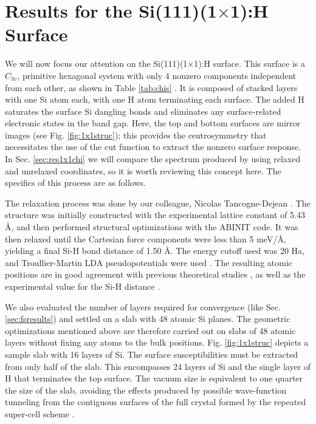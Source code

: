 
\section{Results for the \texorpdfstring{Si(111)(1$\times$1):H}{Si(111)(1x1):H}
Surface}\label{sec:Si1x1results}

We will now focus our attention on the Si(111)(1$\times$1):H surface. This
surface is a $C_{3v}$, primitive hexagonal system with only 4 nonzero components
independent from each other, as shown in Table \ref{tab:chis} \cite{popovbook,
sipePRB87, mizrahiJOSA88}. It is composed of stacked layers with one Si atom
each, with one H atom terminating each surface. The added H saturates the
surface Si dangling bonds and eliminates any surface-related electronic states
in the band gap. Here, the top and bottom surfaces are mirror images (see Fig.
\ref{fig:1x1struc}); this provides the centrosymmetry that necessitates the use
of the cut function to extract the nonzero surface response. In Sec.
\ref{sec:res1x1chi} we will compare the spectrum produced by using relaxed and
unrelaxed coordinates, so it is worth reviewing this concept here. The specifics
of this process are as follows.

The relaxation process was done by our colleague, Nicolas Tancogne-Dejean
\cite{tancognedejean:tel-01235611}. The structure was initially constructed with
the experimental lattice constant of 5.43 \AA, and then performed structural
optimizations with the ABINIT \cite{gonzeCPS09, abinit} code. It was then
relaxed until the Cartesian force components were less than 5 meV/\AA, yielding
a final Si-H bond distance of 1.50 \AA. The energy cutoff used was 20 Ha, and
Troullier-Martin LDA pseudopotentials were used \cite{troullierPRB91}. The
resulting atomic positions are in good agreement with previous theoretical
studies \cite{kaxirasPRB88, jonaPRB95, alfonsoPRB96, cargnoniJOCP00,
mejiaPRB02}, as well as the experimental value for the Si-H distance
\cite{weastCRC88}.

We also evaluated the number of layers required for convergence (like Sec.
\ref{sec:fsresults}) and settled on a slab with 48 atomic Si planes. The
geometric optimizations mentioned above are therefore carried out on slabs of 48
atomic layers without fixing any atoms to the bulk positions. Fig.
\ref{fig:1x1struc} depicts a sample slab with 16 layers of Si. The surface
susceptibilities must be extracted from only half of the slab. This encompasses
24 layers of Si and the single layer of H that terminates the top surface. The
vacuum size is equivalent to one quarter the size of the slab, avoiding the
effects produced by possible wave-function tunneling from the contiguous
surfaces of the full crystal formed by the repeated super-cell scheme
\cite{mendozaPRB06}.

